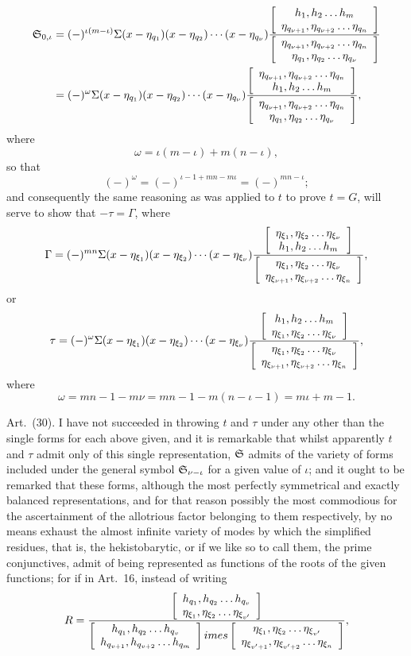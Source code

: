 \documentclass[11pt]{article}
\newcommand{\sourcepage}[1]{\marginpar{\scriptsize p.~#1}}
\newcommand{\art}[1]{\par\smallskip\noindent Art.~(#1).\quad}
\begin{document}
\sourcepage{478}
\[
\begin{aligned}
\mathfrak{S}_{0,\iota}&=(-)^{\iota(m-\iota)}\Sigma(x-\eta_{q_1})(x-\eta_{q_2})\cdots(x-\eta_{q_\nu})
\frac{\left[\begin{array}{c}h_1,h_2\ldots h_m\\\eta_{q_{\nu+1}},\eta_{q_{\nu+2}}\ldots\eta_{q_n}\end{array}\right]}
{\left[\begin{array}{c}\eta_{q_{\nu+1}},\eta_{q_{\nu+2}}\ldots\eta_{q_n}\\\eta_{q_1},\eta_{q_2}\ldots\eta_{q_\nu}\end{array}\right]}\\
&=(-)^\omega\Sigma(x-\eta_{q_1})(x-\eta_{q_2})\cdots(x-\eta_{q_\nu})
\frac{\left[\begin{array}{c}\eta_{q_{\nu+1}},\eta_{q_{\nu+2}}\ldots\eta_{q_n}\\h_1,h_2\ldots h_m\end{array}\right]}
{\left[\begin{array}{c}\eta_{q_{\nu+1}},\eta_{q_{\nu+2}}\ldots\eta_{q_n}\\\eta_{q_1},\eta_{q_2}\ldots\eta_{q_\nu}\end{array}\right]},
\end{aligned}
\]
where
\[
\omega=\iota(m-\iota)+m(n-\iota),
\]
so that
\[
(-)^\omega=(-)^{\iota-1+mn-m\iota}=(-)^{mn-\iota};
\]
and consequently the same reasoning as was applied to $t$ to prove $t=G$, will serve to show that $-\tau=\Gamma$, where
\[
\Gamma=(-)^{mn}\Sigma(x-\eta_{\xi_1})(x-\eta_{\xi_2})\cdots(x-\eta_{\xi_\nu})
\frac{\left[\begin{array}{c}\eta_{\xi_1},\eta_{\xi_2}\ldots\eta_{\xi_\nu}\\h_1,h_2\ldots h_m\end{array}\right]}
{\left[\begin{array}{c}\eta_{\xi_1},\eta_{\xi_2}\ldots\eta_{\xi_\nu}\\\eta_{\xi_{\nu+1}},\eta_{\xi_{\nu+2}}\ldots\eta_{\xi_n}\end{array}\right]},
\]
or
\[
\tau=(-)^\omega\Sigma(x-\eta_{\xi_1})(x-\eta_{\xi_2})\cdots(x-\eta_{\xi_\nu})
\frac{\left[\begin{array}{c}h_1,h_2\ldots h_m\\\eta_{\xi_1},\eta_{\xi_2}\ldots\eta_{\xi_\nu}\end{array}\right]}
{\left[\begin{array}{c}\eta_{\xi_1},\eta_{\xi_2}\ldots\eta_{\xi_\nu}\\\eta_{\xi_{\nu+1}},\eta_{\xi_{\nu+2}}\ldots\eta_{\xi_n}\end{array}\right]},
\]
where
\[
\omega=mn-1-m\nu=mn-1-m(n-\iota-1)=m\iota+m-1.
\]

\art{30} I have not succeeded in throwing $t$ and $\tau$ under any other than the single forms for each above given, and it is remarkable that whilst apparently $t$ and $\tau$ admit only of this single representation, $\mathfrak{S}$ admits of the variety of forms included under the general symbol $\mathfrak{S}_{\nu-\iota}$ for a given value of $\iota$; and it ought to be remarked that these forms, although the most perfectly symmetrical and exactly balanced representations, and for that reason possibly the most commodious for the ascertainment of the allotrious factor belonging to them respectively, by no means exhaust the almost infinite variety of modes by which the simplified residues, that is, the hekistobarytic, or if we like so to call them, the prime conjunctives, admit of being represented as functions of the roots of the given functions; for if in Art.~16, instead of writing
\[
R=\frac{\left[\begin{array}{c}h_{q_1},h_{q_2}\ldots h_{q_v}\\\eta_{\xi_1},\eta_{\xi_2}\ldots\eta_{\xi_{v'}}\end{array}\right]}
{\left[\begin{array}{c}h_{q_1},h_{q_2}\ldots h_{q_v}\\h_{q_{v+1}},h_{q_{v+2}}\ldots h_{q_m}\end{array}\right]	imes
\left[\begin{array}{c}\eta_{\xi_1},\eta_{\xi_2}\ldots\eta_{\xi_{v'}}\\\eta_{\xi_{v'+1}},\eta_{\xi_{v'+2}}\ldots\eta_{\xi_n}\end{array}\right]},
\]
\end{document}
